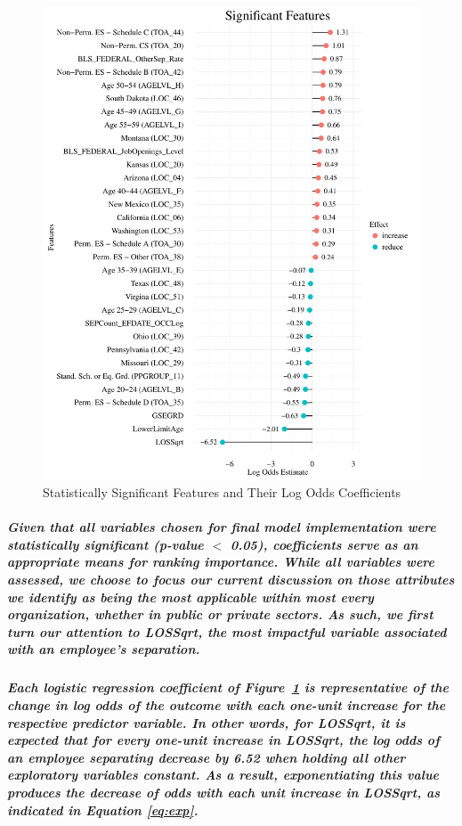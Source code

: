 \documentclass[10pt]{article}
\begin{document}
\subparagraph{}
\begin{figure}[H]
\centering
\includegraphics[width=\linewidth]{Coeffs.pdf}
\caption{Statistically Significant Features and Their Log Odds Coefficients}
\label{fig:Coeffs}
\end{figure}

\subparagraph{Given that all variables chosen for final model implementation were statistically significant (p-value $<$ 0.05), coefficients serve as an appropriate means for ranking importance. While all variables were assessed, we choose to focus our current discussion on those attributes we identify as being the most applicable within most every organization, whether in public or private sectors. As such, we first turn our attention to LOSSqrt, the most impactful variable associated with an employee's separation.}

\subparagraph{Each logistic regression coefficient of Figure~\ref{fig:Coeffs} is representative of the change in log odds of the outcome with each one-unit increase for the respective predictor variable. In other words, for LOSSqrt, it is expected that for every one-unit increase in LOSSqrt, the log odds of an employee separating decrease by 6.52 when holding all other exploratory variables constant. As a result, exponentiating this value produces the decrease of odds with each unit increase in LOSSqrt, as indicated in Equation \ref{eq:exp}.}
\end{document}
